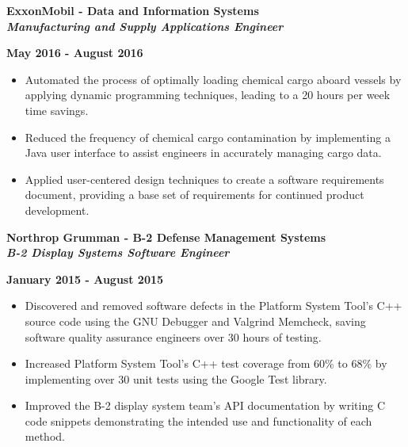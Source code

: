 \documentclass[10pt,letterpaper]{article}
\begin{document}
\medskip

\begin{minipage}[t]{0.53\textwidth}
	\begin{flushleft}
		\textbf{ExxonMobil - Data and Information Systems}\\
		\textbf{\textit{Manufacturing and Supply Applications Engineer}}\\
	\end{flushleft}
\end{minipage}
\begin{minipage}[t]{0.44\textwidth}
	\begin{flushright}
		\textbf{May 2016 - August 2016}
	\end{flushright}
\end{minipage}

\begin{itemize}[noitemsep,topsep=0pt]
	\setlength\itemsep{-0.10em}
	\item Automated the process of optimally loading chemical cargo aboard
	      vessels by applying dynamic programming techniques, leading to a 20
	      hours per week time savings.
	\item Reduced the frequency of chemical cargo contamination by implementing
	      a Java user interface to assist engineers in accurately managing cargo data.
	\item Applied user-centered design techniques to create a software
	      requirements document, providing a base set of requirements for continued
	      product development.
\end{itemize}

\medskip

\begin{minipage}[t]{0.53\textwidth}
	\begin{flushleft}
		\textbf{Northrop Grumman - B-2 Defense Management Systems}\\
		\textbf{\textit{B-2 Display Systems Software Engineer}}\\
	\end{flushleft}
\end{minipage}
\begin{minipage}[t]{0.44\textwidth}
	\begin{flushright}
		\textbf{January 2015 - August 2015}
	\end{flushright}
\end{minipage}

\begin{itemize}[noitemsep,topsep=0pt]
	\setlength\itemsep{-0.10em}
	\item Discovered and removed software defects in the
	      Platform System Tool's C++ source code using the GNU Debugger and Valgrind
	      Memcheck, saving software quality assurance engineers over 30 hours of
	      testing.
	\item Increased Platform System Tool's C++ test coverage from 60\% to 68\% by
	      implementing over 30 unit tests using the Google Test library.
	\item Improved the B-2 display system team's API documentation by writing C code
	      snippets demonstrating the intended use and functionality of each method.
\end{itemize}
\end{document}

